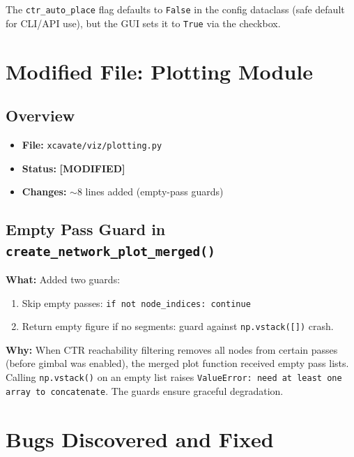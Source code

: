 \documentclass[11pt,a4paper]{article}
\newcommand{\filename}[1]{\texttt{\textcolor{accentblue}{#1}}}
\newcommand{\funcname}[1]{\texttt{\textcolor{codepurple}{#1}}}
\newcommand{\modlabel}{\textcolor{modifiedfile}{\textbf{[MODIFIED]}}}
\begin{document}
\noindent The \texttt{ctr\_auto\_place} flag defaults to \texttt{False} in the config dataclass (safe default for CLI/API use), but the GUI sets it to \texttt{True} via the checkbox.

\section{Modified File: Plotting Module}
\label{sec:plotting}

\subsection{Overview}

\begin{itemize}[nosep]
    \item \textbf{File:} \filename{xcavate/viz/plotting.py}
    \item \textbf{Status:} \modlabel
    \item \textbf{Changes:} $\sim$8 lines added (empty-pass guards)
\end{itemize}

\subsection{Empty Pass Guard in \funcname{create\_network\_plot\_merged()}}

\textbf{What:} Added two guards:
\begin{enumerate}[nosep]
    \item Skip empty passes: \texttt{if not node\_indices: continue}
    \item Return empty figure if no segments: guard against \texttt{np.vstack([])} crash.
\end{enumerate}

\textbf{Why:} When CTR reachability filtering removes all nodes from certain passes (before gimbal was enabled), the merged plot function received empty pass lists. Calling \texttt{np.vstack()} on an empty list raises \texttt{ValueError: need at least one array to concatenate}. The guards ensure graceful degradation.

\section{Bugs Discovered and Fixed}
\label{sec:bugs}
\end{document}
